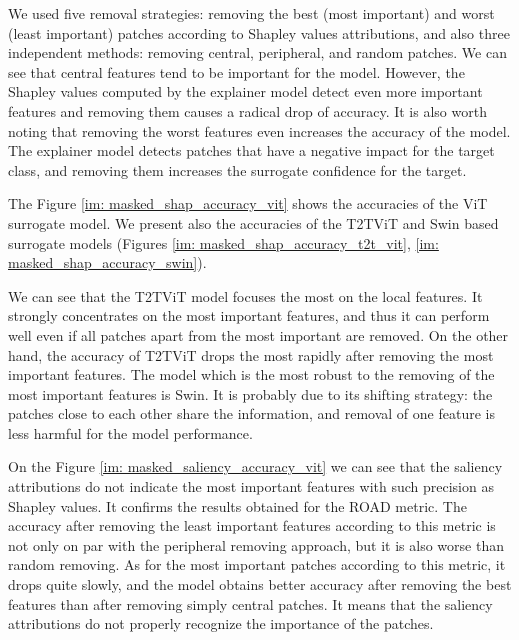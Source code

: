 \documentclass[magisterska,en]{pracamgr}
\begin{document}
We used five removal strategies: removing the best (most important) and worst (least important) patches according to Shapley values attributions, and also three independent methods: removing central, peripheral, and random patches. We can see that central features tend to be important for the model. However, the Shapley values computed by the explainer model detect even more important features and removing them causes a radical drop of accuracy. It is also worth noting that removing the worst features even increases the accuracy of the model. The explainer model detects patches that have a negative impact for the target class, and removing them increases the surrogate confidence for the target.

The Figure \ref{im: masked_shap_accuracy_vit} shows the accuracies of the ViT surrogate model. We present also the accuracies of the T2T\textunderscore ViT and Swin based surrogate models (Figures \ref{im: masked_shap_accuracy_t2t_vit}, \ref{im: masked_shap_accuracy_swin}).





We can see that the T2T\textunderscore ViT model focuses the most on the local features. It strongly concentrates on the most important features, and thus it can perform well even if all patches apart from the most important are removed. On the other hand, the accuracy of T2T\textunderscore ViT drops the most rapidly after removing the most important features. The model which is the most robust to the removing of the most important features is Swin. It is probably due to its shifting strategy: the patches close to each other share the information, and removal of one feature is less harmful for the model performance.

On the Figure \ref{im: masked_saliency_accuracy_vit} we can see that the saliency attributions do not indicate the most important features with such precision as Shapley values. It confirms the results obtained for the ROAD metric. The accuracy after removing the least important features according to this metric is not only on par with the peripheral removing approach, but it is also worse than random removing. As for the most important patches according to this metric, it drops quite slowly, and the model obtains better accuracy after removing the best features than after removing simply central patches. It means that the saliency attributions do not properly recognize the importance of the patches.
\end{document}
